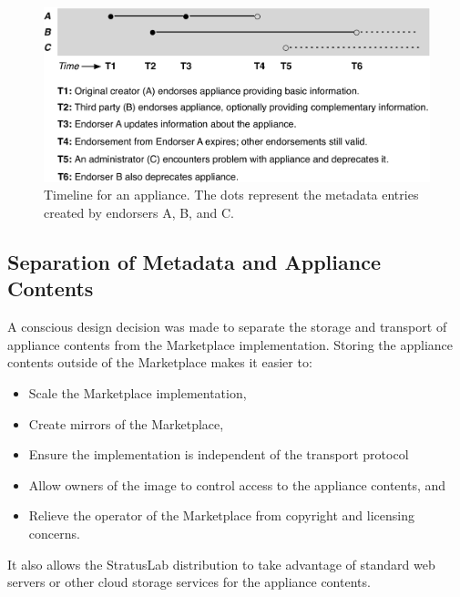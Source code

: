 \begin{figure}
\begin{center}
\includegraphics[width=\columnwidth]{timeline.pdf}
\end{center}
\caption{Timeline for an appliance.  The dots represent the metadata
  entries created by endorsers A, B, and C\@.}
\label{fig:timeline}
\end{figure}

\subsection{Separation of Metadata and Appliance Contents}

A conscious design decision was made to separate the storage and
transport of appliance contents from the Marketplace implementation.
Storing the appliance contents outside of the Marketplace makes it
easier to:
\begin{itemize}
\item Scale the Marketplace implementation,
\item Create mirrors of the Marketplace,
\item Ensure the implementation is independent of the transport
  protocol
\item Allow owners of the image to control access to the appliance
  contents, and
\item Relieve the operator of the Marketplace from
  copyright and licensing concerns.
\end{itemize}
It also allows the StratusLab distribution to take advantage of
standard web servers or other cloud storage services for the appliance
contents.

